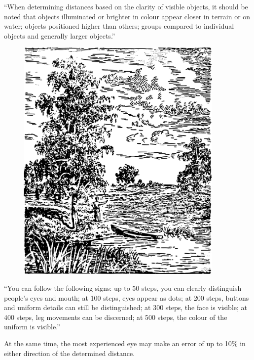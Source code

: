 ``When determining distances based on the clarity of visible objects, it should be noted that objects illuminated or brighter in colour appear closer in terrain or on water; objects positioned higher than others; groups compared to individual objects and generally larger objects.''

\begin{figure}[h!]
\centering
\includegraphics[width=0.9\textwidth]{figures/ch-04/fig-079.pdf}
\end{figure}

``You can follow the following signs: up to 50 steps, you can clearly distinguish people's eyes and mouth; at 100 steps, eyes appear as dots; at 200 steps, buttons and uniform details can still be distinguished; at 300 steps, the face is visible; at 400 steps, leg movements can be discerned; at 500 steps, the colour of the uniform is visible.''

At the same time, the most experienced eye may make an error of up to 10\% in either direction of the determined distance.



